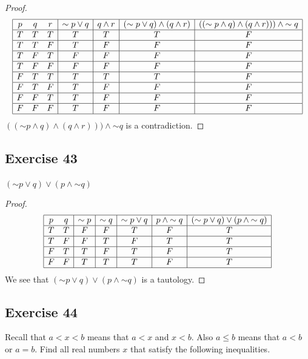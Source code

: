 \documentclass[14pt]{extarticle}
\begin{document}
\begin{proof} $$ \begin{array}{|ccc|c|c|c|c|} \hline p & q & r & {\sim p} \vee q
& q \wedge r & ({\sim p} \vee q) \wedge (q \wedge r)& (({\sim p} \wedge q)
\wedge (q \wedge r))) \wedge {\sim q} \\ \hline T & T & T & T & T & T & F \\
\hline T & T & F & T & F & F & F \\ \hline T & F & T & F & F & F & F \\ \hline T
& F & F & F & F & F & F \\ \hline F & T & T & T & T & T & F \\ \hline F & T & F
& T & F & F & F \\ \hline F & F & T & T & F & F & F \\ \hline F & F & F & T & F
& F & F \\ \hline \end{array} $$ $(({\sim p} \wedge q) \wedge (q \wedge r)))
\wedge {\sim q}$ is a contradiction. \end{proof}

\subsection{Exercise 43} $({\sim p} \vee q) \vee (p \wedge {\sim q})$
\begin{proof} $$ \begin{array}{|cc|c|c|c|c|c|} \hline p & q & {\sim p} & {\sim
q} & {\sim p} \vee q & p \wedge {\sim q} & ({\sim p} \vee q) \vee (p \wedge
{\sim q}) \\ \hline T & T & F & F & T & F & T \\ \hline T & F & F & T & F & T &
T \\ \hline F & T & T & F & T & F & T \\ \hline F & F & T & T & T & F & T \\
\hline \end{array} $$ We see that $({\sim p} \vee q) \vee (p \wedge {\sim q})$
is a tautology. \end{proof}

\subsection{Exercise 44} Recall that $a < x < b$ means that $a < x$ and $x < b$.
Also $a \leq b$ means that $a < b$ or $a = b$. Find all real numbers $x$ that
satisfy the following inequalities.
\end{document}
